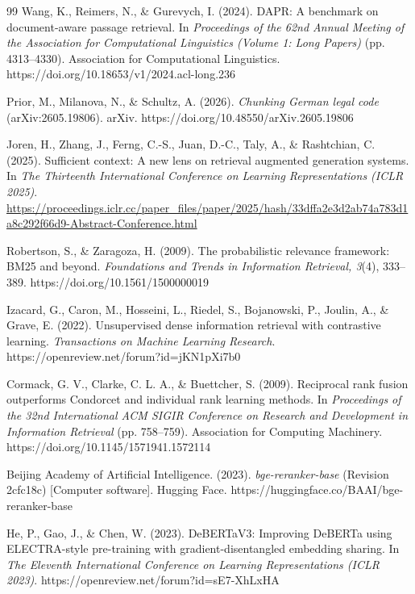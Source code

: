 \begin{thebibliography}{99}
 Wang, K., Reimers, N., \& Gurevych, I. (2024). DAPR: A benchmark on document-aware passage retrieval. In \emph{Proceedings of the 62nd Annual Meeting of the Association for Computational Linguistics (Volume 1: Long Papers)} (pp. 4313--4330). Association for Computational Linguistics. https://doi.org/10.18653/v1/2024.acl-long.236

 Prior, M., Milanova, N., \& Schultz, A. (2026). \emph{Chunking German legal code} (arXiv:2605.19806). arXiv. https://doi.org/10.48550/arXiv.2605.19806

 Joren, H., Zhang, J., Ferng, C.-S., Juan, D.-C., Taly, A., \& Rashtchian, C. (2025). Sufficient context: A new lens on retrieval augmented generation systems. In \emph{The Thirteenth International Conference on Learning Representations (ICLR 2025)}. \url{https://proceedings.iclr.cc/paper_files/paper/2025/hash/33dffa2e3d2ab74a783d1a8c292f66d9-Abstract-Conference.html}

 Robertson, S., \& Zaragoza, H. (2009). The probabilistic relevance framework: BM25 and beyond. \emph{Foundations and Trends in Information Retrieval, 3}(4), 333--389. https://doi.org/10.1561/1500000019

 Izacard, G., Caron, M., Hosseini, L., Riedel, S., Bojanowski, P., Joulin, A., \& Grave, E. (2022). Unsupervised dense information retrieval with contrastive learning. \emph{Transactions on Machine Learning Research}. https://openreview.net/forum?id=jKN1pXi7b0

 Cormack, G. V., Clarke, C. L. A., \& Buettcher, S. (2009). Reciprocal rank fusion outperforms Condorcet and individual rank learning methods. In \emph{Proceedings of the 32nd International ACM SIGIR Conference on Research and Development in Information Retrieval} (pp. 758--759). Association for Computing Machinery. https://doi.org/10.1145/1571941.1572114

 Beijing Academy of Artificial Intelligence. (2023). \emph{bge-reranker-base} (Revision 2cfc18c) [Computer software]. Hugging Face. https://huggingface.co/BAAI/bge-reranker-base

 He, P., Gao, J., \& Chen, W. (2023). DeBERTaV3: Improving DeBERTa using ELECTRA-style pre-training with gradient-disentangled embedding sharing. In \emph{The Eleventh International Conference on Learning Representations (ICLR 2023)}. https://openreview.net/forum?id=sE7-XhLxHA


\end{thebibliography}
